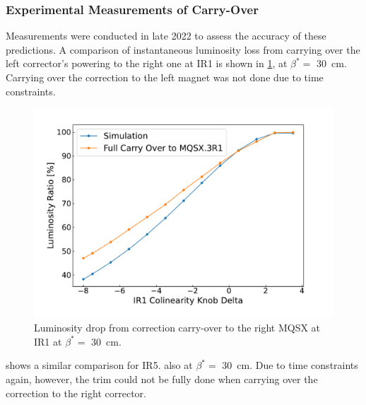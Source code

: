 \subsubsection*{Experimental Measurements of Carry-Over}

Measurements were conducted in late \num{2022} to assess the accuracy of these predictions.
A comparison of instantaneous luminosity loss from carrying over the left corrector's powering to the right one at IR\num{1} is shown in \cref{figure:ir1_carry_over_vs_simulation}, at \(\beta^{\ast} =\) \qty{30}{\centi\meter}.
Carrying over the correction to the left magnet was not done due to time constraints.

\begin{figure}[!htb]
    \centering
    \includegraphics*[width=\textwidth]{Figures/IR_Coupling_Correction/ir1_scan_vs_simu.pdf}
    \caption{Luminosity drop from correction carry-over to the right MQSX at IR\num{1} at \(\beta^{\ast} =\) \qty{30}{\centi\meter}.}
    \label{figure:ir1_carry_over_vs_simulation}
\end{figure}

 shows a similar comparison for IR\num{5}. also at \(\beta^{\ast} =\) \qty{30}{\centi\meter}.
Due to time constraints again, however, the trim could not be fully done when carrying over the correction to the right corrector.

